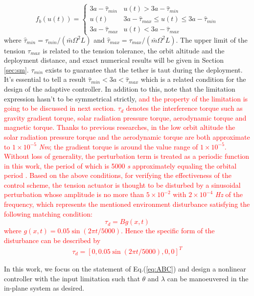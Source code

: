 \documentclass[3p]{elsarticle}
\theoremstyle{plain}
\begin{document}
\begin{equation}
f_b(u(t)) =\begin{cases}
3a-\hat{\tau}_{min}   & u(t) > 3a-\hat{\tau}_{min}\\
u(t)           & 3a - \hat{\tau}_{max} \le u(t) \le 3a-\hat{\tau}_{min}\\
3a-\hat{\tau}_{max}   & u(t) < 3a - \hat{\tau}_{max}
\end{cases}\label{eq:f_b}
\end{equation}
where $\hat{\tau}_{min} = \tau_{min}/(\bar{m}\Omega^2L)$ and $\hat{\tau}_{max} = \tau_{max}/(\bar{m}\Omega^2L)$. The upper limit of the tension $\tau_{max} $ is related to the tension tolerance, the orbit altitude and the deployment distance, and exact numerical results will be given in Section \ref{sec:sm}. $\tau_{min}$ exists to guarantee that the tether is taut during the deployment. It's essential to tell a result $\hat\tau_{min}<3a<\hat\tau_{max}$ which is a related condition for the design of the adaptive controller. In addition to this, note that the limitation expression hasn't to be symmetrical strictly, \textcolor{red}{and the property of the limitation is going to be discussed in next section.} \textcolor{red}{$\tau_d$ denotes the interference torque such as gravity gradient torque, solar radiation pressure torque, aerodynamic torque and magnetic torque. Thanks to previous researches, in the low orbit altitude the solar radiation pressure torque and the aerodynamic torque are both approximate to $1\times 10^{-5}$ \textit{Nm}; the gradient torque is around the value range of $1\times 10^{-5}$. Without loss of generality, the perturbation term is treated as a periodic function in this work, the period of which is 5000 \textit{s} approximately equaling the orbital period \cite{liu2013calculation,inamori2015magnetic}. Based on the above conditions, for verifying the effectiveness of the control scheme, the tension actuator is thought to be disturbed by a sinusoidal perturbation whose amplitude is no more than $5\times 10^{-2}$ with $2\times 10^{-4}$ \textit{Hz} of the frequency, which represents the mentioned environment disturbance satisfying the following matching condition:
\begin{equation}
\tau_d=Bg(x,t)
\end{equation}
where $g(x,t) = 0.05\sin(2\pi t /5000)$. Hence the specific form of the disturbance can be described by
\begin{align}
\tau_d = [0,0.05\sin (2\pi t /5000),0,0]^T\label{eq:disturbance}
\end{align}}\par
In this work, we focus on the statement of Eq.(\ref{eq:ABC}) and design a nonlinear controller with the input limitation such that $\theta$ and $\lambda$ can be manoeuvered in the in-plane system as desired.
\end{document}
